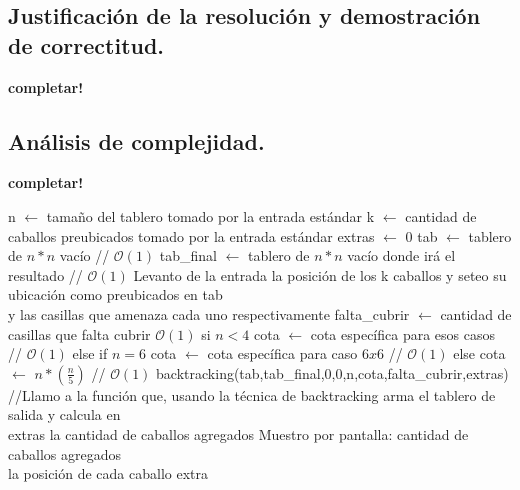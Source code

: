\newpage
\subsection{Justificación de la resolución y demostración de correctitud.}

\vspace*{0.3cm}

\textbf{completar!}



\newpage
\subsection{Análisis de complejidad.}

\vspace*{0.3cm}

\textbf{completar!}
\begin{codebox}
\li n $\leftarrow$ tamaño del tablero tomado por la entrada estándar
\li k $\leftarrow$ cantidad de caballos preubicados tomado por la entrada estándar
\li extras $\leftarrow$ 0
\li tab $\leftarrow$ tablero de $n*n$ vacío // $\mathcal{O}(1)$
\li tab_final $\leftarrow$ tablero de $n*n$ vacío donde irá el resultado // $\mathcal{O}(1)$
\li Levanto de la entrada la posición de los k caballos y seteo su ubicación como preubicados en tab \\ y las casillas que amenaza cada uno respectivamente
\li falta_cubrir $\leftarrow$ cantidad de casillas que falta cubrir $\mathcal{O}(1)$
\li si $n<4$
\li \quad cota $\leftarrow$ cota específica para esos casos  // $\mathcal{O}(1)$
\li \qquad else
\li \quad if $n=6$
\li \quad \quad cota $\leftarrow$ cota específica para caso $6x6$  // $\mathcal{O}(1)$
\li \quad \qquad else
\li \quad \quad cota $\leftarrow$ $n*(\frac{n}{5})$   // $\mathcal{O}(1)$
\li backtracking(tab,tab_final,0,0,n,cota,falta_cubrir,extras)
\li //Llamo a la función que, usando la técnica de backtracking arma el tablero de salida y calcula en\\ extras la cantidad de caballos agregados
\li Muestro por pantalla: cantidad de caballos agregados\\la posición de cada caballo extra
\end{codebox}

